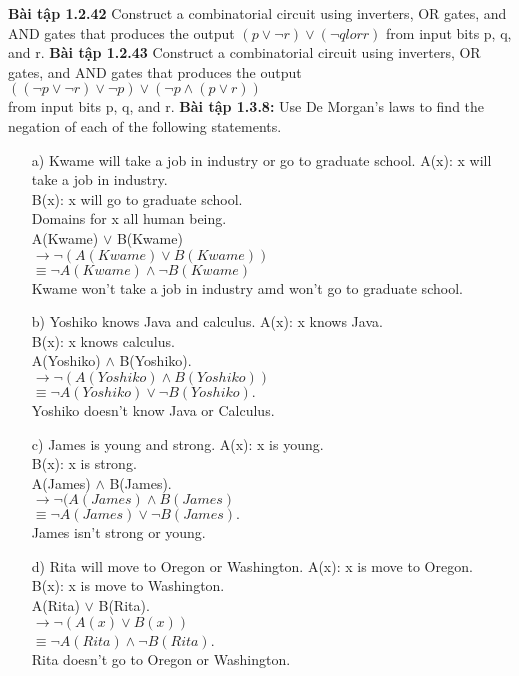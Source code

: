\documentclass[a4paper]{article}
\begin{document}
\textbf{Bài tập 1.2.42} Construct a combinatorial circuit using inverters, OR gates, and AND gates that produces the output $(p \lor \lnot r) \lor (\lnot q lor r)$ from input bits p, q, and r.
\textbf{Bài tập 1.2.43} Construct a combinatorial circuit using inverters, OR gates, and AND gates that produces the output $((\lnot p \lor \lnot r) \lor \lnot p) \lor (\lnot p \land (p \lor r))$\\ from input bits p, q, and r.
\textbf{Bài tập 1.3.8:}  Use De Morgan’s laws to find the negation of each of the following statements.
\begin{enumerate}
	\item[a)] Kwame will take a job in industry or go to graduate school.
				A(x): x will take a job in industry.\\
				B(x): x will go to graduate school.\\
				Domains for x all human being.\\
				A(Kwame) $\lor$ B(Kwame)\\
				$\rightarrow \lnot (A(Kwame) \lor B(Kwame))$\\
				$\equiv \lnot A(Kwame) \land \lnot B(Kwame)$\\
				Kwame won't take a job in industry amd won't go to graduate school.
	\item[b)] Yoshiko knows Java and calculus.
				A(x): x knows Java.\\
				B(x): x knows calculus.\\
				A(Yoshiko) $\land$ B(Yoshiko).\\
				$\rightarrow \lnot (A(Yoshiko) \land B(Yoshiko))$\\
				$\equiv \lnot A(Yoshiko) \lor \lnot B(Yoshiko).$\\
				Yoshiko doesn't know Java or Calculus.\\
	\item[c)] James is young and strong.
				A(x): x is young.\\
				B(x): x is strong.\\
				A(James) $\land$ B(James).\\
				$\rightarrow \lnot (A(James) \land B(James)$\\
				$\equiv \lnot A(James) \lor \lnot B(James).$\\
				James isn't strong or young.\\
	\item[d)] Rita will move to Oregon or Washington.
				A(x): x is move to Oregon.\\
				B(x): x is move to Washington.\\
				A(Rita) $\lor$ B(Rita).\\
				$\rightarrow \lnot (A(x) \lor B(x))$\\
				$\equiv \lnot A(Rita) \land \lnot B(Rita)$.\\
				Rita doesn't go to Oregon or Washington.\\
\end{enumerate}
\end{document}
